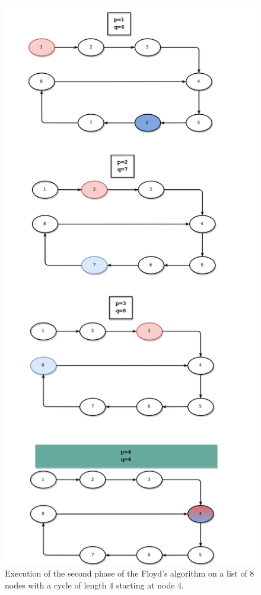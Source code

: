 \begin{figure}[htbp]
	\label{fig:cycle_in_list:flow2}
	\centering
	\includegraphics[scale=0.15]{sources/cycle_in_list/images/flow2}
	\caption{Execution of the second phase of the Floyd's algorithm on a list of $8$ nodes with a cycle of length $4$ starting at node $4$.}
\end{figure}

